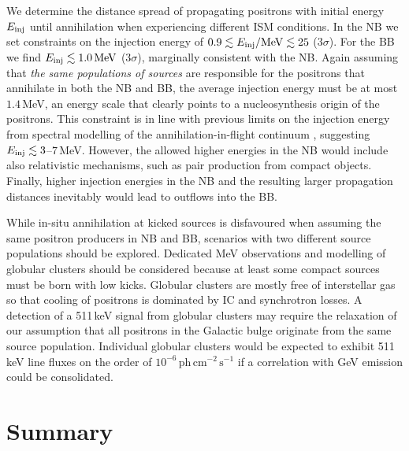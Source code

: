 \documentclass[doublespace,nopageskip]{VTthesis} %
\begin{document}
	We determine the distance spread of propagating positrons with initial energy $E_{\rm inj}$ until annihilation when experiencing different ISM conditions.
	In the NB we set constraints on the injection energy of $0.9 \lesssim E_{\rm inj}/\mathrm{MeV} \lesssim 25$ ($3\sigma$).
	For the BB we find $E_{\rm inj} \lesssim 1.0\,\mathrm{MeV}$ ($3\sigma$), marginally consistent with the NB.
	Again assuming that \textit{the same populations of sources} are responsible for the positrons that annihilate in both the NB and BB, the average injection energy must be at most $1.4$\,MeV, an energy scale that clearly points to a nucleosynthesis origin of the positrons.
	This constraint is in line with previous limits on the injection energy from spectral modelling of the annihilation-in-flight continuum \citep{Beacom2006_511,Sizun2006_511}, suggesting $E_{\rm inj} \lesssim 3$--$7$\,MeV.
	However, the allowed higher energies in the NB would include also relativistic mechanisms, such as pair production from compact objects.
	Finally, higher injection energies in the NB and the resulting larger propagation distances inevitably would lead to outflows into the BB.
	
	
	While in-situ annihilation at kicked sources is disfavoured when assuming the same positron producers in NB and BB, scenarios with two different source populations should be explored.
	Dedicated MeV observations and modelling of globular clusters should be considered because at least some compact sources must be born with low kicks.
	Globular clusters are mostly free of interstellar gas so that cooling of positrons is dominated by IC and synchrotron losses.
	A detection of a 511\,keV signal from globular clusters may require the relaxation of our assumption that all positrons in the Galactic bulge originate from the same source population.
	Individual globular clusters would be expected to exhibit 511\,keV line fluxes on the order of $10^{-6}\,\mathrm{ph\,cm^{-2}\,s^{-1}}$ if a correlation with GeV emission \citep{Bartels2018_binaries511} could be consolidated.

\chapter{Summary} \label{ch:summary}



% 
%    
\end{document}
